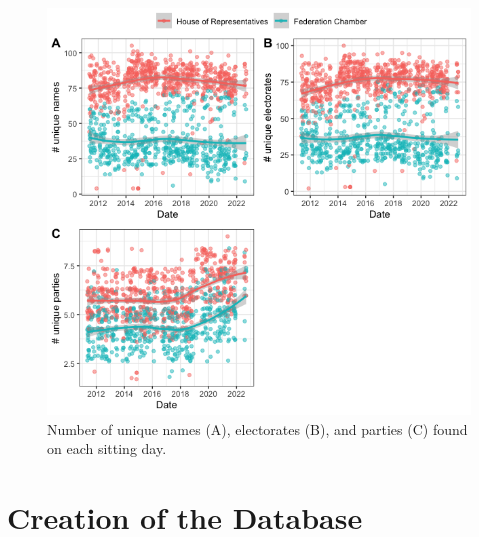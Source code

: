 \documentclass[
  letterpaper,
  DIV=11,
  numbers=noendperiod]{scrartcl}
\begin{document}
\begin{figure}

{\centering \includegraphics{unique_plots.png}

}

\caption{\label{fig-unique_plots}Number of unique names (A), electorates
(B), and parties (C) found on each sitting day.}

\end{figure}

\begin{table}

\end{table}

\hypertarget{sec-create}{%
\section{Creation of the Database}\label{sec-create}}
\end{document}
